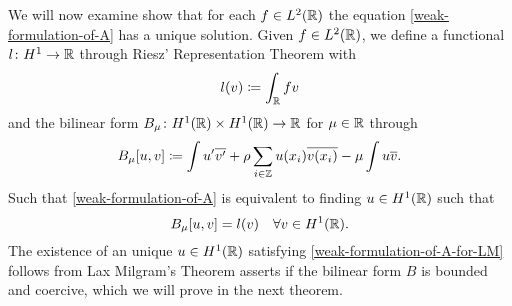 We will now examine show that for each $f \in L^{2}(\mathbb{R})$ the equation \eqref{weak-formulation-of-A} has a unique solution. Given $f \in L^{2}(\mathbb{R})$, we define a functional $l \colon H^{1} \rightarrow \mathbb{R}$ through Riesz' Representation Theorem with
	\[ l(v) \coloneqq \int_{\mathbb{R}} f v \]
and the bilinear form $B_{\mu} \colon H^{1}(\mathbb{R}) \times H^{1}(\mathbb{R}) \rightarrow \mathbb{R}$ for $\mu \in \mathbb{R}$ through
	\[ B_{\mu}[u, v] \coloneqq \int u' \overline{v'} + \rho \sum_{i \in \mathbb{Z}} u(x_{i}) \overline{v(x_{i})} - \mu \int u \overline{v}. \]
Such that \eqref{weak-formulation-of-A} is equivalent to finding $u \in H^{1}(\mathbb{R})$ such that
	\begin{equation}
		B_{\mu}[u, v] =  l(v) \quad \forall v \in H^{1}(\mathbb{R}). \label{weak-formulation-of-A-for-LM}
	\end{equation}
The existence of an unique $u \in H^{1}(\mathbb{R})$ satisfying \eqref{weak-formulation-of-A-for-LM} follows from Lax Milgram's Theorem asserts if the bilinear form $B$ is bounded and coercive, which we will prove in the next theorem.

